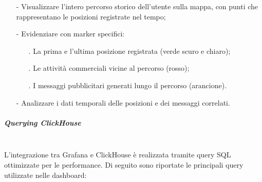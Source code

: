 \documentclass[10pt]{article}
\newcommand{\mysubparagraph}[1]{\subparagraph{#1}\mbox{}\\}
\begin{document}
        \begin{itemize}
            \item[-] Visualizzare l'intero percorso storico dell'utente sulla mappa, con punti che rappresentano le posizioni registrate nel tempo;
            \item[-] Evidenziare con marker specifici:
            \begin{itemize}
                \item[.] La prima e l'ultima posizione registrata (verde scuro e chiaro);
                \item[.] Le attività commerciali vicine al percorso (rosso);
                \item[.] I messaggi pubblicitari generati lungo il percorso (arancione).
            \end{itemize}
            \item[-] Analizzare i dati temporali delle posizioni e dei messaggi correlati.
        \end{itemize}
        
        \mysubparagraph{Querying ClickHouse}
        L'integrazione tra Grafana e ClickHouse è realizzata tramite query SQL ottimizzate per le performance. Di seguito sono riportate le principali query utilizzate nelle dashboard:
        
\end{document}
